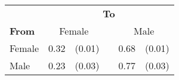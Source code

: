 
\begin{tabular}{lr@{ }r@{\,\,}cr@{ }r}
    \toprule
    & \multicolumn{5}{c}{\textbf{To}} \\
    \cmidrule(l){2-6}
    \textbf{From} & \multicolumn{2}{c}{Female} && \multicolumn{2}{c}{Male} \\
    \midrule
    Female & 0.32 & (0.01) &  & 0.68 & (0.01) \\
    Male & 0.23 & (0.03) &  & 0.77 & (0.03) \\
    \bottomrule
\end{tabular}
